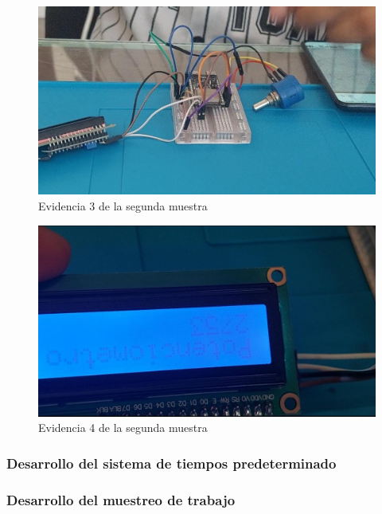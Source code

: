 \begin{figure}[H]
        \centering
        \includegraphics[trim = {0mm 0mm 0mm 0mm},clip,scale=0.2]{10/Img/muestra2Prueba3.jpg}
        \caption{Evidencia 3 de la segunda muestra}
        \label{muestra2Prueba3}
    \end{figure}

\begin{figure}[H]
        \centering
        \includegraphics[trim = {0mm 0mm 0mm 0mm},clip,scale=0.2]{10/Img/muestra2Prueba4.jpg}
        \caption{Evidencia 4 de la segunda muestra}
        \label{muestra2Prueba4}
    \end{figure}
%
%
\subsubsection{Desarrollo del sistema de tiempos predeterminado}


\subsubsection{Desarrollo del muestreo de trabajo}

